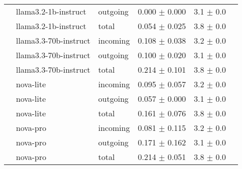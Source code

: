 \begin{table}[ht]
\begin{tabular}{llllrr}
 & llama3.2-1b-instruct & outgoing & 0.000 $\pm$ 0.000 & 3.1 $\pm$ 0.0 \\
 & llama3.2-1b-instruct & total & 0.054 $\pm$ 0.025 & 3.8 $\pm$ 0.0 \\
 & llama3.3-70b-instruct & incoming & 0.108 $\pm$ 0.038 & 3.2 $\pm$ 0.0 \\
 & llama3.3-70b-instruct & outgoing & 0.100 $\pm$ 0.020 & 3.1 $\pm$ 0.0 \\
 & llama3.3-70b-instruct & total & 0.214 $\pm$ 0.101 & 3.8 $\pm$ 0.0 \\
 & nova-lite & incoming & 0.095 $\pm$ 0.057 & 3.2 $\pm$ 0.0 \\
 & nova-lite & outgoing & 0.057 $\pm$ 0.000 & 3.1 $\pm$ 0.0 \\
 & nova-lite & total & 0.161 $\pm$ 0.076 & 3.8 $\pm$ 0.0 \\
 & nova-pro & incoming & 0.081 $\pm$ 0.115 & 3.2 $\pm$ 0.0 \\
 & nova-pro & outgoing & 0.171 $\pm$ 0.162 & 3.1 $\pm$ 0.0 \\
 & nova-pro & total & 0.214 $\pm$ 0.051 & 3.8 $\pm$ 0.0 \\
\bottomrule
\end{tabular}
\end{table}